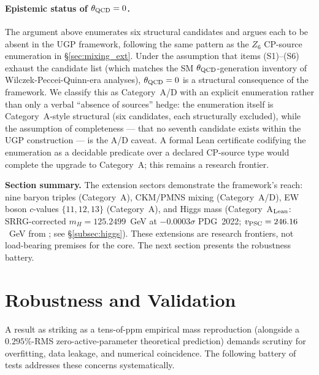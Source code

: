 \documentclass[11pt]{article}
\theoremstyle{remark}
\begin{document}
\paragraph{Epistemic status of $\theta_{\rm QCD} = 0$.}
The argument above enumerates six structural candidates and argues each to be absent in the UGP framework, following the same pattern as the $Z_6$ CP-source enumeration in \S\ref{sec:mixing_ext}.  Under the assumption that items (S1)--(S6) exhaust the candidate list (which matches the SM $\theta_{\rm QCD}$-generation inventory of Wilczek-Peccei-Quinn-era analyses), $\theta_{\rm QCD} = 0$ is a structural consequence of the framework.  We classify this as Category~A/D with an explicit enumeration rather than only a verbal ``absence of sources'' hedge: the enumeration itself is Category~A-style structural (six candidates, each structurally excluded), while the assumption of completeness --- that no seventh candidate exists within the UGP construction --- is the A/D caveat.  A formal Lean certificate codifying the enumeration as a decidable predicate over a declared CP-source type would complete the upgrade to Category~A; this remains a research frontier.

\begin{tcolorbox}[colback=gray!4,colframe=gray!40,left=5pt,right=5pt,top=3pt,bottom=3pt]
\small\textbf{Section summary.}
The extension sectors demonstrate the framework's reach: nine baryon triples (Category~A), CKM/PMNS mixing (Category~A/D), EW boson $c$-values $\{11,12,13\}$ (Category~A), and Higgs mass (Category~A$_{\rm Lean}$: SRRG-corrected $m_H = 125.2499$~GeV at $-0.0003\sigma$ PDG~2022; $v_{\rm PSC}=246.16$~GeV from \cite{SpivackSRRG}; see \S\ref{subsec:higgs}).  These extensions are research frontiers, not load-bearing premises for the core.
The next section presents the robustness battery.
\end{tcolorbox}


\section{Robustness and Validation}
\label{sec:robustness}

A result as striking as a tens-of-ppm empirical mass reproduction (alongside a $0.295\%$-RMS zero-active-parameter theoretical prediction) demands scrutiny for overfitting, data leakage, and numerical coincidence.
The following battery of tests addresses these concerns systematically.
\end{document}

